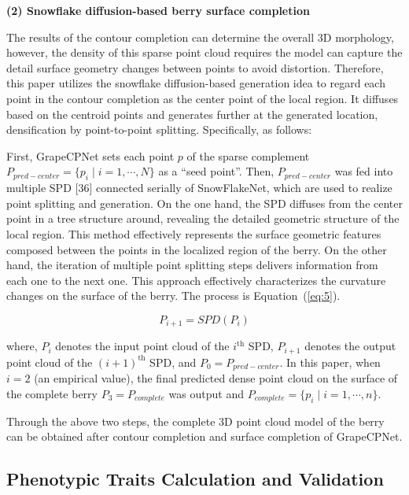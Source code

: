 \documentclass[12pt]{article}
\begin{document}
{\raggedright\textbf{(2) Snowflake diffusion-based berry surface completion}}

The results of the contour completion can determine the overall 3D morphology, however, the density of this sparse point cloud requires the model can capture the detail surface geometry changes between points to avoid distortion. 
Therefore, this paper utilizes the snowflake diffusion-based generation idea to regard each point in the contour completion as the center point of the local region. 
It diffuses based on the centroid points and generates further at the generated location, densification by point-to-point splitting. 
Specifically, as follows:

First, GrapeCPNet sets each point $p$ of the sparse complement $P_{pred-center}=\{p_i \mid i=1,\cdots,N\}$ as a ``seed point''. 
Then, $P_{pred-center}$ was fed into multiple SPD [36] connected serially of SnowFlakeNet, which are used to realize point splitting and generation. 
On the one hand, the SPD diffuses from the center point in a tree structure around, revealing the detailed geometric structure of the local region. 
This method effectively represents the surface geometric features composed between the points in the localized region of the berry. 
On the other hand, the iteration of multiple point splitting steps delivers information from each one to the next one. 
This approach effectively characterizes the curvature changes on the surface of the berry. The process is Equation~(\ref{eq:5}).

\begin{equation}
    P_{i+1} = SPD(P_i)
    \label{eq:5}
\end{equation}

{\raggedright where, $P_i$ denotes the input point cloud of the $i^{\text{th}}$ SPD, $P_{i+1}$ denotes the output point cloud of the $(i+1)^{\text{th}}$ SPD, and $P_0=P_{pred-center}$. 
In this paper, when $i=2$ (an empirical value), the final predicted dense point cloud on the surface of the complete berry $P_3=P_{complete}$ was output and $P_{complete}=\{p_i \mid i=1,\cdots,n\}$.}

Through the above two steps, the complete 3D point cloud model of the berry can be obtained after contour completion and surface completion of GrapeCPNet.

\subsection{Phenotypic Traits Calculation and Validation}
\end{document}
